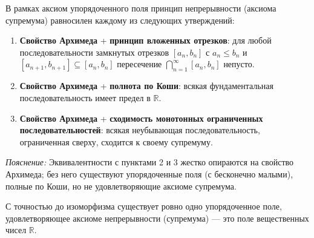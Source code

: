 \documentclass[11pt, a4paper]{extarticle}
\newcommand{\R}{{\mathbb R}}
\renewcommand{\le}{\leqslant}
\begin{document}
\begin{theorem}
В рамках аксиом упорядоченного поля принцип непрерывности (аксиома супремума) равносилен каждому из следующих утверждений:
\begin{enumerate}
    \item \textbf{Свойство Архимеда} + \textbf{принцип вложенных отрезков}: для любой последовательности замкнутых отрезков $[a_n, b_n]$ с $a_n \le b_n$ и $[a_{n+1}, b_{n+1}] \subseteq [a_n, b_n]$ пересечение $\bigcap_{n=1}^\infty [a_n, b_n]$ непусто.
    \item \textbf{Свойство Архимеда} + \textbf{полнота по Коши}: всякая фундаментальная последовательность имеет предел в $\R$.
    \item \textbf{Свойство Архимеда} + \textbf{сходимость монотонных ограниченных последовательностей}: всякая неубывающая последовательность, ограниченная сверху, сходится к своему супремуму.
\end{enumerate}
\end{theorem}
\noindent\textit{Пояснение:} Эквивалентности с пунктами 2 и 3 жестко опираются на свойство Архимеда; без него существуют упорядоченные поля (с бесконечно малыми), полные по Коши, но не удовлетворяющие аксиоме супремума.


\begin{theorem}
С точностью до изоморфизма существует ровно одно упорядоченное поле, удовлетворяющее аксиоме непрерывности (супремума) --- это поле вещественных чисел $\R$.
\end{theorem}
    
\end{document}
